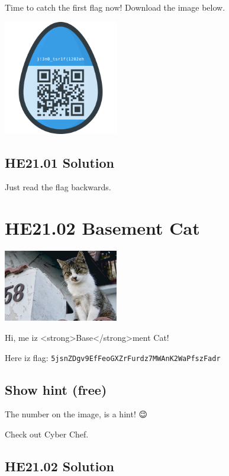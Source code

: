 \documentclass[english,a4paper,nols,noindent]{tufte-handout}
\begin{document}
Time to catch the first flag now! Download the image below.
\begin{marginfigure}
    \includegraphics[width=50mm]{ch01/first_egg.png}
\end{marginfigure}

\hypertarget{he21.01-solution}{%
\subsection{HE21.01 Solution}\label{he21.01-solution}}

Just read the flag backwards.

\hypertarget{he21.02}{%
\section{HE21.02 Basement Cat}\label{he21.02}}

\begin{marginfigure}
    \includegraphics[width=50mm]{images/challenge2.jpg}
\end{marginfigure}
Hi, me iz <strong>Base</strong>ment Cat!

Here iz flag: \verb+5jsnZDgv9EfFeoGXZrFurdz7MWAnK2WaPfszFadr+

\subsection{Show hint (free)}
The number on the image, is a hint! 😉

Check out Cyber Chef.

\hypertarget{he21.02-solution}{%
\subsection{HE21.02 Solution}\label{he21.02-solution}}
\end{document}
